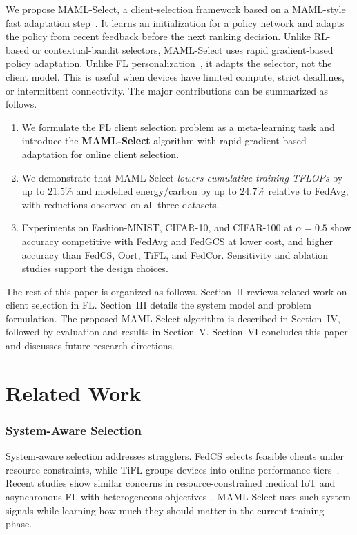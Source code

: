 \documentclass[journal]{IEEEtran}
\newcommand{\revision}[1]{#1}
\begin{document}
\revision{We propose MAML-Select, a client-selection framework based on a MAML-style fast adaptation step}~\cite{finn2017model}. \revision{It learns an initialization for a policy network and adapts the policy from recent feedback before the next ranking decision. Unlike RL-based or contextual-bandit selectors, MAML-Select uses rapid gradient-based policy adaptation. Unlike FL personalization}~\cite{fallah2020personalized}, \revision{it adapts the selector, not the client model. This is useful when devices have limited compute, strict deadlines, or intermittent connectivity.} The major contributions can be summarized as follows.
\begin{enumerate}
\setlength{\itemsep}{0pt}
\setlength{\topsep}{1pt}
		\item We formulate the FL client selection problem as a meta-learning task and introduce the \textbf{MAML-Select} algorithm with \revision{rapid gradient-based} adaptation for online client selection.
		\item We demonstrate that MAML-Select \revision{\textit{lowers cumulative training TFLOPs} by up to $21.5\%$ and modelled energy/carbon by up to $24.7\%$ relative to FedAvg, with reductions observed on all three datasets}.
	\item \revision{Experiments on Fashion-MNIST, CIFAR-10, and CIFAR-100 at $\alpha = 0.5$ show accuracy competitive with FedAvg and FedGCS at lower cost, and higher accuracy than FedCS, Oort, TiFL, and FedCor. Sensitivity and ablation studies support the design choices.}
\end{enumerate}

The rest of this paper is organized as follows. Section~II reviews related work on client selection in FL. Section~III details the system model and problem formulation. The proposed MAML-Select algorithm is described in Section~IV, followed by evaluation and results in Section~V. Section~VI concludes this paper and discusses future research directions.

\section{Related Work}
\subsubsection{System-Aware Selection}
System-aware selection addresses stragglers. FedCS selects feasible clients under resource constraints, while TiFL groups devices into online performance tiers~\cite{nishio2019client,chai2020tifl}. Recent studies show similar concerns in resource-constrained medical IoT and asynchronous FL with heterogeneous objectives~\cite{tapwal2026stragglers,forootani2026asynchronous}. MAML-Select uses such system signals while learning how much they should matter in the current training phase.
\end{document}
